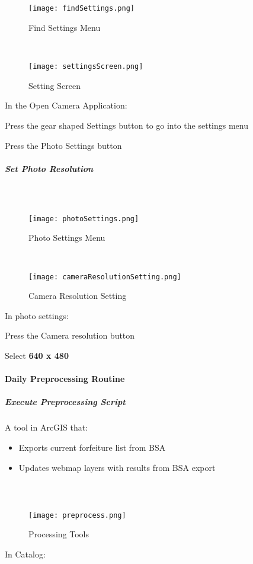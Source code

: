 \documentclass[class=book , crop=false, titlepage, twoside, multi={itemize, figure, verbatim}, float=false]{standalone}
\begin{document}
\subparagraph*{}
%
%
\begin{wrapfigure}{r}{0.5\textwidth}
\centering
\texttt{[image: findSettings.png]}
\caption{Find Settings Menu}
\vspace{.25in}

\HRule \\[.4cm] %
\vspace{.25in}

\texttt{[image: settingsScreen.png]}
\caption{Setting Screen}
\end{wrapfigure}
In the Open Camera Application:
\vspace{1in}

\noindent Press the gear shaped \Large Settings \normalsize button to go into the settings menu
\vspace{3in}

\noindent Press the \Large Photo Settings \normalsize button
\clearpage
%
%
%
\subparagraph*{Set Photo Resolution}
\subparagraph*{\\}
%
%
\begin{wrapfigure}{r}{0.5\textwidth}
\centering
\texttt{[image: photoSettings.png]}
\caption{Photo Settings Menu}
\vspace{.25in}

\HRule \\[.4cm] %
\vspace{.25in}

\texttt{[image: cameraResolutionSetting.png]}
\caption{Camera Resolution Setting}
\end{wrapfigure}
In \Large photo settings:
\vspace{1in}

\noindent Press the \Large Camera resolution \normalsize button
\vspace{3in}

\noindent Select \textbf{\LARGE 640 x 480}
\clearpage
%
%
%
\paragraph{Daily Preprocessing Routine}
\subparagraph{Execute Preprocessing Script}A tool in ArcGIS that:
\begin{itemize}
\item Exports current forfeiture list from BSA
\item Updates webmap layers with results from BSA export
\end{itemize}
\subparagraph*{\\}
%
%
\begin{wrapfigure}{r}{0.75\textwidth}
\centering
\texttt{[image: preprocess.png]}
\caption{Processing Tools}
\end{wrapfigure}
In Catalog:
\vspace{1in}
\end{document}

